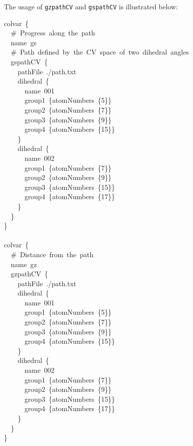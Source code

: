 The usage of \texttt{gzpathCV} and \texttt{gspathCV} is illustrated below:

\begin{cvexampleinput}
\-colvar~\{\\
\-~~\#~Progress~along~the~path\\
\-~~name~gs\\
\-~~\#~Path~defined~by~the~CV~space~of~two~dihedral~angles\\
\-~~gspathCV~\{\\
\-~~~~pathFile~./path.txt\\
\-~~~~dihedral~\{\\
\-~~~~~~name~001\\
\-~~~~~~group1~\{atomNumbers~\{5\}\}\\
\-~~~~~~group2~\{atomNumbers~\{7\}\}\\
\-~~~~~~group3~\{atomNumbers~\{9\}\}\\
\-~~~~~~group4~\{atomNumbers~\{15\}\}\\
\-~~~~\}\\
\-~~~~dihedral~\{\\
\-~~~~~~name~002\\
\-~~~~~~group1~\{atomNumbers~\{7\}\}\\
\-~~~~~~group2~\{atomNumbers~\{9\}\}\\
\-~~~~~~group3~\{atomNumbers~\{15\}\}\\
\-~~~~~~group4~\{atomNumbers~\{17\}\}\\
\-~~~~\}\\
\-~~\}\\
\}\\
\\
\-colvar~\{\\
\-~~\#~Distance~from~the~path\\
\-~~name~gz\\
\-~~gzpathCV~\{\\
\-~~~~pathFile~./path.txt\\
\-~~~~dihedral~\{\\
\-~~~~~~name~001\\
\-~~~~~~group1~\{atomNumbers~\{5\}\}\\
\-~~~~~~group2~\{atomNumbers~\{7\}\}\\
\-~~~~~~group3~\{atomNumbers~\{9\}\}\\
\-~~~~~~group4~\{atomNumbers~\{15\}\}\\
\-~~~~\}\\
\-~~~~dihedral~\{\\
\-~~~~~~name~002\\
\-~~~~~~group1~\{atomNumbers~\{7\}\}\\
\-~~~~~~group2~\{atomNumbers~\{9\}\}\\
\-~~~~~~group3~\{atomNumbers~\{15\}\}\\
\-~~~~~~group4~\{atomNumbers~\{17\}\}\\
\-~~~~\}\\
\-~~\}\\
\}
\end{cvexampleinput}



